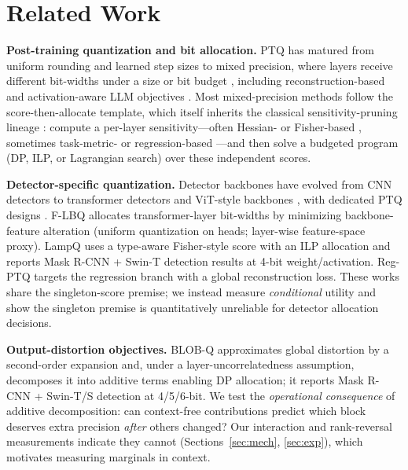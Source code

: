 \section{Related Work}
\label{sec:related}

\noindent\textbf{Post-training quantization and bit allocation.}
PTQ has matured from uniform rounding \cite{gptq,adaround,repqvit} and
learned step sizes \cite{jacob2018quant,esser2020lsq}
to mixed precision, where layers receive different bit-widths under a size or
bit budget \cite{haq,hawq,bitsplit,dong2020hawqv2,yao2021hawqv3},
including reconstruction-based \cite{nagel2021brecq,wei2022qdrop}
and activation-aware LLM objectives \cite{xiao2023smoothquant,lin2024awq}.
Most mixed-precision methods follow
the score-then-allocate template, which itself inherits the classical
sensitivity-pruning lineage \cite{lecun1990obd}: compute
a per-layer sensitivity---often
Hessian- or Fisher-based \cite{hawq,lampq}, sometimes
task-metric- or
regression-based \cite{regptq}---and then solve a budgeted program (DP,
ILP, or Lagrangian search) over these independent scores.

\smallskip
\noindent\textbf{Detector-specific quantization.}
Detector backbones have evolved from CNN detectors
\cite{ren2015faster} to transformer detectors
\cite{carion2020detr,zhu2021deformable} and ViT-style backbones
\cite{dosovitskiy2021vit}, with dedicated PTQ designs
\cite{li2022ptq4vit,liu2021qvit,lin2022fqvit}.
F-LBQ \cite{flbq} allocates transformer-layer bit-widths by minimizing
backbone-feature alteration (uniform quantization on heads; layer-wise
feature-space proxy). LampQ \cite{lampq} uses a type-aware Fisher-style
score with an ILP allocation and reports Mask R-CNN + Swin-T detection
results at 4-bit weight/activation. Reg-PTQ \cite{regptq} targets the
regression branch with a global reconstruction loss. These works share
the singleton-score premise; we instead measure \emph{conditional}
utility and show the singleton premise is quantitatively unreliable for
detector allocation decisions.

\smallskip
\noindent\textbf{Output-distortion objectives.}
BLOB-Q \cite{blobq} approximates global distortion by a second-order
expansion and, under a layer-uncorrelatedness assumption, decomposes it
into additive terms enabling DP allocation; it reports Mask R-CNN +
Swin-T/S detection at 4/5/6-bit. We test the
\emph{operational consequence} of additive decomposition: can
context-free contributions predict which block deserves extra precision
\emph{after} others changed? Our interaction and rank-reversal
measurements indicate they cannot (Sections~\ref{sec:mech},
\ref{sec:exp}), which motivates measuring marginals in context.

